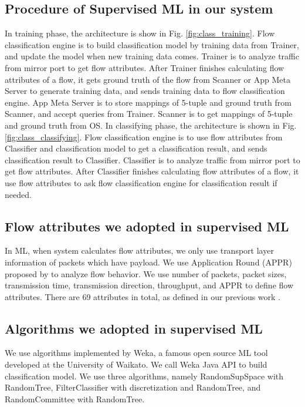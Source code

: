 \documentclass[journal]{IEEEtran}
\begin{document}
\subsection{Procedure of Supervised ML in our system}
In training phase, the architecture is show in Fig. \ref{fig:class_training}. Flow classification engine is to build classification model by training data from Trainer, and update the model when new training data comes. Trainer is to analyze traffic from mirror port to get flow attributes. After Trainer finishes calculating flow attributes of a flow, it gets ground truth of the flow from Scanner or App Meta Server to generate training data, and sends training data to flow classification engine. App Meta Server is to store mappings of 5-tuple and ground truth from Scanner, and accept queries from Trainer. Scanner is to get mappings of 5-tuple and ground truth from OS.
In classifying phase, the architecture is shown in Fig. \ref{fig:class_classifying}. Flow classification engine is to use flow attributes from Classifier and classification model to get a classification result, and sends classification result to Classifier. Classifier is to analyze traffic from mirror port to get flow attributes. After Classifier finishes calculating flow attributes of a flow, it use flow attributes to ask flow classification engine for classification result if needed.



\subsection{Flow attributes we adopted in supervised ML}
In ML, when system calculates flow attributes, we only use transport layer information of packets which have payload. We use Application Round (APPR) proposed by \cite{classfication-cloud} to analyze flow behavior. We use number of packets, packet sizes, transmission time, transmission direction, throughput, and APPR to define flow attributes. There are 69 attributes in total, as defined in our previous work \cite{Chia-Chin-master}.




\subsection{Algorithms we adopted in supervised ML}
We use algorithms implemented by Weka, a famous open source ML tool developed at the University of Waikato. We call Weka Java API to build classification model. We use three algorithms, namely RandomSupSpace with RandomTree, FilterClassifier with discretization and RandomTree, and RandomCommittee with RandomTree.
\end{document}
